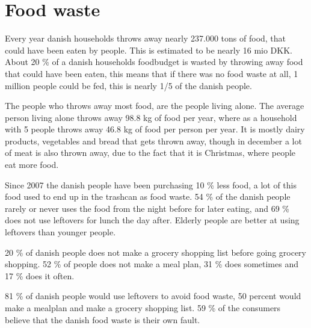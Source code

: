 \section{Food waste}
Every year danish households throws away nearly 237.000 tons of food, that could have been eaten by people. This is estimated to be nearly 16 mio DKK. About 20 \% of a danish households foodbudget is wasted by throwing away food that could have been eaten, this means that if there was no food waste at all, 1 million people could be fed, this is nearly 1/5 of the danish people.

The people who throws away most food, are the people living alone. The average person living alone throws away 98.8 kg of food per year, where as a household with 5 people throws away 46.8 kg of food per person per year. It is mostly dairy products, vegetables and bread that gets thrown away, though in december a lot of meat is also thrown away, due to the fact that it is Christmas, where people eat more food.

Since 2007 the danish people have been purchasing 10 \% less food, a lot of this food used to end up in the trashcan as food waste. 54 \% of the danish people rarely or never uses the food from the night before for later eating, and 69 \% does not use leftovers for lunch the day after. Elderly people are better at using leftovers than younger people. 

20 \% of danish people does not make a grocery shopping list before going grocery shopping. 52 \% of people does not make a meal plan, 31 \% does sometimes and 17 \% does it often.

81 \% of danish people would use leftovers to avoid food waste, 50 percent would make a mealplan and make a grocery shopping list. 59 \% of the consumers believe that the danish food waste is their own fault.
